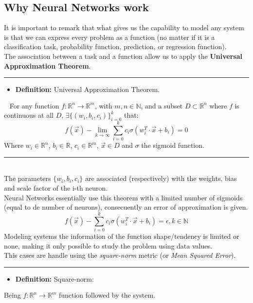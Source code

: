 \documentclass[a4paper, 11pt]{article}
\begin{document}
\subsection{Why Neural Networks work}
\label{whyworks}
It is important to remark that what gives us the capability to model any system is that we can express every problem as a function (no matter if it is a classification task, probability function, prediction, or regression function).\\
The association between a task and a function allow us to apply the \textbf{Universal Approximation Theorem}.\\
\rule{\linewidth}{0.4pt}
\begin{itemize}
    \item \textbf{Definition:} Universal Approximation Theorem.
\end{itemize}  
For any function $f:\mathbb{R}^n \rightarrow \mathbb{R}^m$, with $m,n\in\mathbb{N}$, and a subset $D\subset \mathbb{R}^n$ where $f$ is continuous at all $D$, 
$\exists \{(w_i, b_i, c_i)\}_{i = 0}^k$ that: 
$$f(\vec{x}) - \lim_{k \rightarrow \infty} \sum_{i=0}^{k} c_i \sigma \left( w_i^T \cdot \vec{x} + b_i \right) = 0$$
Where $w_i \in \mathbb{R}^n$, $b_i\in \mathbb{R}$, $c_i \in \mathbb{R}^m$, $\vec{x}\in D$ and $\sigma$ the sigmoid function.\\
\rule{\linewidth}{0.4pt}\\\vspace{0.5em}
The parameters $\{w_i, b_i, c_i\}$ are associated (respectively) with the weights, bias and scale factor of the i-th neuron.\\
Neural Networks essentially use this theorem with a limited number of sigmoids (equal to de number of neurons), consecuently an error of approximation is given.
$$f(\vec{x})-\sum_{i=0}^{k} c_i \sigma \left( w_i^T \cdot \vec{x} + b_i \right) = \epsilon, k \in \mathbb{N}$$
Modeling systems the information of the function shape/tendency is limited or none, making it only possible to study the problem using data values.\\
This cases are handle using the \textit{square-norm} metric (or \textit{Mean Squared Error}).\\
\newpage
\hspace{-1.6em}\rule{\linewidth}{0.4pt}
\begin{itemize}
    \item \textbf{Definition:} Square-norm: 
\end{itemize}
Being $f:\mathbb{R}^n \rightarrow \mathbb{R}^m$ function followed by the system.
\end{document}
